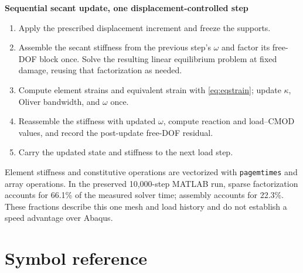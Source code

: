 \documentclass[11pt]{article}
\begin{document}
\begin{algobox}
\textbf{Sequential secant update, one displacement-controlled step}
\begin{enumerate}[leftmargin=1.4em,itemsep=2pt]
\item Apply the prescribed displacement increment and freeze the supports.
\item Assemble the secant stiffness from the previous step's $\omega$ and
      factor its free-DOF block once. Solve the resulting linear equilibrium
      problem at fixed damage, reusing that factorization as needed.
\item Compute element strains and equivalent strain with \eqref{eq:eqstrain};
      update $\kappa$, Oliver bandwidth, and $\omega$ once.
\item Reassemble the stiffness with updated $\omega$, compute reaction and
      load--CMOD values, and record the post-update free-DOF residual.
\item Carry the updated state and stiffness to the next load step.
\end{enumerate}
\end{algobox}

Element stiffness and constitutive operations are vectorized with
\texttt{pagemtimes} and array operations. In the preserved 10,000-step MATLAB
run, sparse factorization accounts for 66.1\% of the measured solver time;
assembly accounts for 22.3\%. These fractions describe this one mesh and
load history and do not establish a speed advantage over Abaqus.

\section{Symbol reference}
\end{document}
